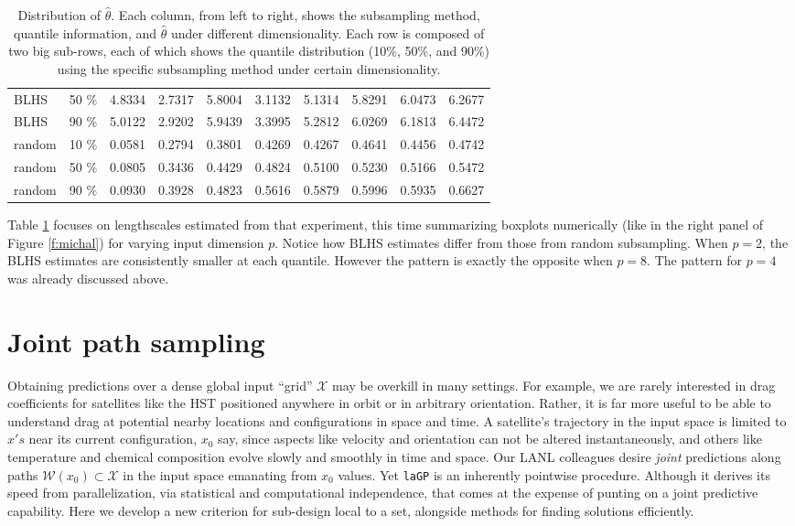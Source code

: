 \documentclass[12pt]{article}
\begin{document}
\begin{table}[ht!]
\begin{tabular}{l l r r r r r r r r}
  BLHS & 50 \% & 4.8334 & 2.7317 & 5.8004 & 3.1132 & 5.1314 & 5.8291 & 6.0473 & 6.2677 \\ 
  BLHS & 90 \% & 5.0122 & 2.9202 & 5.9439 & 3.3995 & 5.2812 & 6.0269 & 6.1813 & 6.4472 \\ 
  \hline 
  random & 10 \% & 0.0581 & 0.2794 & 0.3801 & 0.4269 & 0.4267 & 0.4641 & 0.4456 & 0.4742 \\ 
  random & 50 \% & 0.0805 & 0.3436 & 0.4429 & 0.4824 & 0.5100 & 0.5230 & 0.5166 & 0.5472 \\ 
  random & 90 \% & 0.0930 & 0.3928 & 0.4823 & 0.5616 & 0.5879 & 0.5996 & 0.5935 & 0.6627 \\ 
  \bottomrule
 \end{tabular}
 \caption{Distribution of $\hat{\theta}$.  Each column, from left to right, shows the subsampling method, 
 quantile information, and $\hat{\theta}$ under different dimensionality. Each row is composed of two big 
 sub-rows, each of which shows the quantile distribution (10\%, 50\%, and 90\%) using the specific subsampling 
 method under certain dimensionality.}
\label{t:michal:that}
\end{table}

Table \ref{t:michal:that} focuses on lengthscales estimated from that
experiment, this time summarizing boxplots numerically (like in the right
panel of Figure \ref{f:michal}) for varying input dimension $p$. Notice
how BLHS estimates differ from those from random
subsampling.  When $p=2$, the BLHS estimates are consistently smaller at each
quantile.  However the pattern is exactly the opposite when 
$p=8$. The pattern for $p=4$ was already discussed above.

\section{Joint path sampling}
\label{sec:joint}

Obtaining predictions over a dense global input ``grid'' $\mathcal{X}$ may be
overkill in many settings. For example, we are rarely interested in drag
coefficients for satellites like the HST positioned anywhere in orbit or in
arbitrary orientation. Rather, it is far more useful to be able to understand
drag at potential nearby locations and configurations in space and time.  A
satellite's trajectory in the input space is limited to $x's$ near its current
configuration, $x_0$ say, since aspects like velocity and orientation can not
be altered instantaneously, and others like temperature and chemical
composition evolve slowly and smoothly in time and space. Our LANL colleagues
desire {\em joint} predictions along paths $\mathcal{W}(x_0)
\subset \mathcal{X}$ in the input space emanating from $x_0$ values. 
Yet {\tt laGP} is an inherently pointwise procedure.  Although it derives its
speed from parallelization, via statistical and computational independence,
that comes at the expense of punting on a joint predictive capability. Here we develop a new
criterion for sub-design local to a set, alongside methods for finding solutions efficiently.
\end{document}
